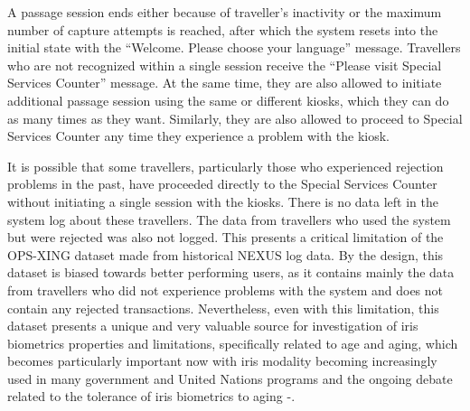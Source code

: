 \documentclass{cta-author}%
\begin{document}
A passage session ends either because of traveller's inactivity or the maximum number of capture attempts is reached, after which the system resets into the initial state with the ``Welcome. Please choose your language'' message.
Travellers who are not recognized  within a single session receive the ``Please visit Special Services Counter'' message. At the same time, they are also allowed to initiate additional passage session  using the same or different kiosks, which they can do as many times as they want. Similarly, they are also allowed to proceed to Special Services Counter any time they experience a problem with the kiosk. 

It is possible that some travellers, particularly those who experienced rejection problems in the past, have proceeded directly to the Special Services Counter  without  initiating a single session with the kiosks. 
There is no data left in the system log about these travellers.
The data from travellers who used the system but were rejected was also not logged.
This presents a critical limitation of the 
OPS-XING dataset made from historical NEXUS log data. By the design, this  dataset is biased towards better performing users, as it contains mainly the data from travellers who did not experience problems with the system and does not contain any rejected transactions.
Nevertheless, 
even with this limitation, this dataset presents a unique and very valuable source for investigation of iris biometrics properties and limitations, specifically related to age and aging, which 
becomes particularly important now with iris modality becoming increasingly   used in many government and United Nations programs \cite{kn:Rathgeb-IBPC2014,FBI-IJCB2014} 
and the ongoing debate related to the tolerance of iris biometrics to aging \cite{IET0}-\cite{aging3}.
\end{document}
